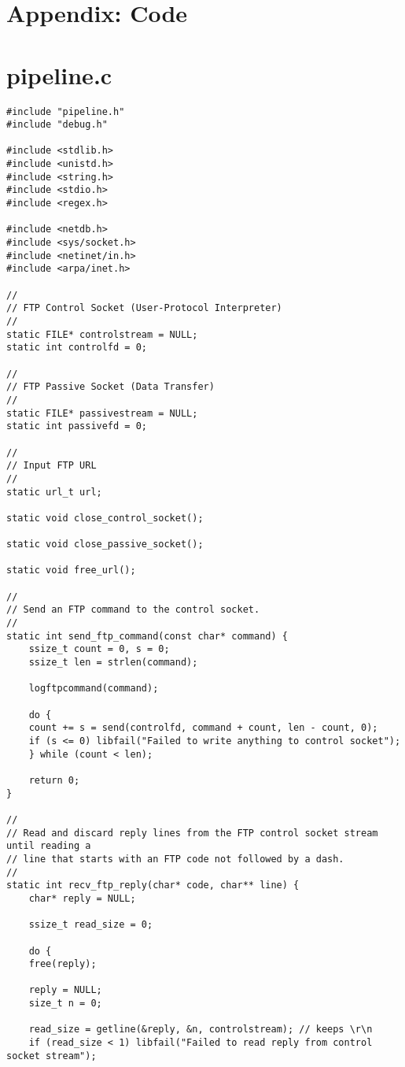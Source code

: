 \documentclass[subfiles]{main.tex}
\begin{document}
\section{Appendix: Code}

\section*{pipeline.c}

\begin{lstlisting}[style=C-sublime]
#include "pipeline.h"
#include "debug.h"

#include <stdlib.h>
#include <unistd.h>
#include <string.h>
#include <stdio.h>
#include <regex.h>

#include <netdb.h>
#include <sys/socket.h>
#include <netinet/in.h>
#include <arpa/inet.h>

//
// FTP Control Socket (User-Protocol Interpreter)
//
static FILE* controlstream = NULL;
static int controlfd = 0;

//
// FTP Passive Socket (Data Transfer)
//
static FILE* passivestream = NULL;
static int passivefd = 0;

//
// Input FTP URL
//
static url_t url;

static void close_control_socket();

static void close_passive_socket();

static void free_url();

//
// Send an FTP command to the control socket.
//
static int send_ftp_command(const char* command) {
	ssize_t count = 0, s = 0;
	ssize_t len = strlen(command);
	
	logftpcommand(command);
	
	do {
	count += s = send(controlfd, command + count, len - count, 0);
	if (s <= 0) libfail("Failed to write anything to control socket");
	} while (count < len);
	
	return 0;
}

//
// Read and discard reply lines from the FTP control socket stream until reading a
// line that starts with an FTP code not followed by a dash.
//
static int recv_ftp_reply(char* code, char** line) {
	char* reply = NULL;
	
	ssize_t read_size = 0;
	
	do {
	free(reply);
	
	reply = NULL;
	size_t n = 0;
	
	read_size = getline(&reply, &n, controlstream); // keeps \r\n
	if (read_size < 1) libfail("Failed to read reply from control socket stream");
	

\end{lstlisting}
\end{document}
